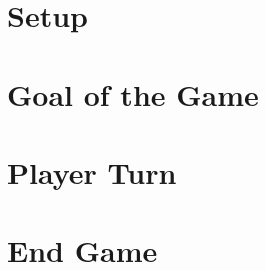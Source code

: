 \documentclass[12pt]{article}
\begin{document}
\pagebreak

\begin{mdframed}[style = customFrame]
\begin{multicols*}{2}

\section*{Setup}
\section*{Goal of the Game}
\section*{Player Turn}
\section*{End Game}

\end{multicols*}
\end{mdframed}
\end{document}
